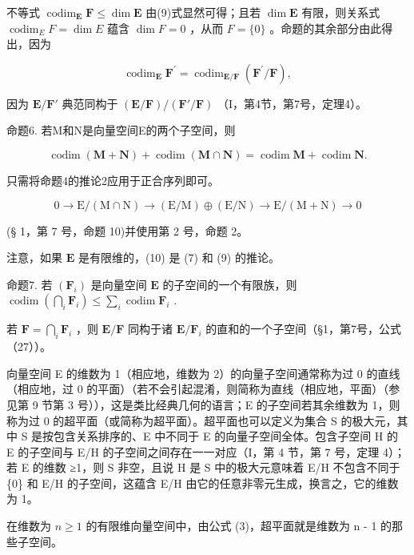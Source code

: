 不等式 \(\operatorname{codim}_{\mathbf{E}} \mathbf{F} \leqslant \dim \mathbf{E}\) 由(9)式显然可得；且若 \(\dim \mathbf{E}\) 有限，则关系式 \(\operatorname{codim}_{E} F = \dim E\) 蕴含 \(\dim F = 0\) ，从而 \(F = \{0\}\) 。命题的其余部分由此得出，因为

\[
\operatorname{codim} _ {\mathbf {E}} \mathbf {F} ^ {\prime} = \operatorname{codim} _ {\mathbf {E} / \mathbf {F}} (\mathbf {F} ^ {\prime} / \mathbf {F}),
\]

因为 \(\mathbf{E} / \mathbf{F}'\) 典范同构于 \((\mathbf{E} / \mathbf{F}) / (\mathbf{F}' / \mathbf{F})\) （I，第4节，第7号，定理4）。

命题6. 若M和N是向量空间E的两个子空间，则

\[
\operatorname{codim} (\mathbf {M} + \mathbf {N}) + \operatorname{codim} (\mathbf {M} \cap \mathbf {N}) = \operatorname{codim} \mathbf {M} + \operatorname{codim} \mathbf {N}.\tag{10}
\]

只需将命题4的推论2应用于正合序列即可。

\[
0 \rightarrow \mathrm{E} / (\mathrm{M} \cap \mathrm{N}) \rightarrow (\mathrm{E} / \mathrm{M}) \oplus (\mathrm{E} / \mathrm{N}) \rightarrow \mathrm{E} / (\mathrm{M} + \mathrm{N}) \rightarrow 0
\]

(§ 1，第 7 号，命题 10)并使用第 2 号，命题 2。

注意，如果 \(\mathbf{E}\) 是有限维的，(10) 是 (7) 和 (9) 的推论。

命题7. 若 \((\mathbf{F}_i)\) 是向量空间 \(\mathbf{E}\) 的子空间的一个有限族，则 \(\operatorname{codim}\left(\bigcap_i \mathbf{F}_i\right) \leqslant \sum_i \operatorname{codim} \mathbf{F}_i\) .

若 \(\mathbf{F} = \bigcap_{i}\mathbf{F}_{i}\) ，则 \(\mathbf{E} / \mathbf{F}\) 同构于诸 \(\mathbf{E} / \mathbf{F}_i\) 的直和的一个子空间（§1，第7号，公式（27））。

向量空间 E 的维数为 1（相应地，维数为 2）的向量子空间通常称为过 0 的直线（相应地，过 0 的平面）（若不会引起混淆，则简称为直线（相应地，平面）（参见第 9 节第 3 号）），这是类比经典几何的语言；E 的子空间若其余维数为 1，则称为过 0 的超平面（或简称为超平面）。超平面也可以定义为集合 S 的极大元，其中 S 是按包含关系排序的、E 中不同于 E 的向量子空间全体。包含子空间 H 的 E 的子空间与 E/H 的子空间之间存在一一对应（I，第 4 节，第 7 号，定理 4）；若 E 的维数 ≥1，则 S 非空，且说 H 是 S 中的极大元意味着 E/H 不包含不同于 \{0\} 和 E/H 的子空间，这蕴含 E/H 由它的任意非零元生成，换言之，它的维数为 1。

在维数为 \(n \geqslant 1\) 的有限维向量空间中，由公式 (3)，超平面就是维数为 n - 1 的那些子空间。

